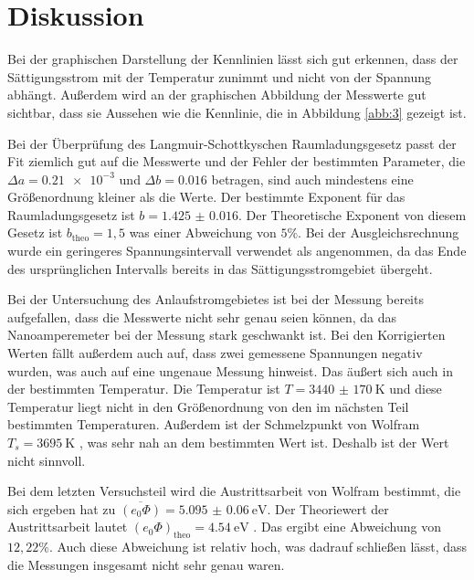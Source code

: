 \section{Diskussion}

Bei der graphischen Darstellung der Kennlinien lässt sich gut erkennen, dass
der Sättigungsstrom mit der Temperatur zunimmt und nicht von der Spannung abhängt.
Außerdem wird an der graphischen Abbildung der Messwerte gut sichtbar, dass sie
Aussehen wie die Kennlinie, die in Abbildung \ref{abb:3} gezeigt ist.

Bei der Überprüfung des Langmuir-Schottkyschen Raumladungsgesetz passt der Fit
ziemlich gut auf die Messwerte und der Fehler der bestimmten Parameter, die
$\Delta a = \num{0.21e-3}$ und $\Delta b = \num{0.016}$ betragen, sind auch mindestens eine
Größenordnung kleiner als die Werte.
Der bestimmte Exponent für das Raumladungsgesetz ist $b = \num{1.425(16)}$. Der
Theoretische Exponent von diesem Gesetz ist $b_\text{theo} = 1,5$ was einer Abweichung
von $5 \%$. Bei der Ausgleichsrechnung wurde ein geringeres Spannungsintervall
verwendet als angenommen, da das Ende des ursprünglichen Intervalls bereits in das
Sättigungsstromgebiet übergeht.

Bei der Untersuchung des Anlaufstromgebietes ist bei der Messung bereits aufgefallen,
dass die Messwerte nicht sehr genau seien können, da das Nanoamperemeter bei der
Messung stark geschwankt ist. Bei den Korrigierten Werten fällt außerdem
auch auf, dass zwei gemessene Spannungen negativ wurden, was auch auf eine
ungenaue Messung hinweist. Das äußert sich auch in der bestimmten Temperatur.
Die Temperatur ist $T = \SI{3440(170)}{\kelvin}$ und diese Temperatur liegt nicht in
den Größenordnung von den im nächsten Teil bestimmten Temperaturen. Außerdem ist der
Schmelzpunkt von Wolfram $ T_s = \SI{3695}{\kelvin}$ \cite{2}, was sehr nah an dem
bestimmten Wert ist. Deshalb ist der Wert nicht sinnvoll.

Bei dem letzten Versuchsteil wird die Austrittsarbeit von Wolfram bestimmt, die
sich ergeben hat zu $ \overline{(e_0\Phi)} = \SI{5.095(60)}{\eV}$. Der Theoriewert der Austrittsarbeit
lautet $ (e_0 \Phi)_\text{theo} = \SI{4.54}{\eV}$ \cite{3}. Das ergibt eine Abweichung von $12,22 \%$.
Auch diese Abweichung ist relativ hoch, was dadrauf schließen lässt, dass die Messungen
insgesamt nicht sehr genau waren.
